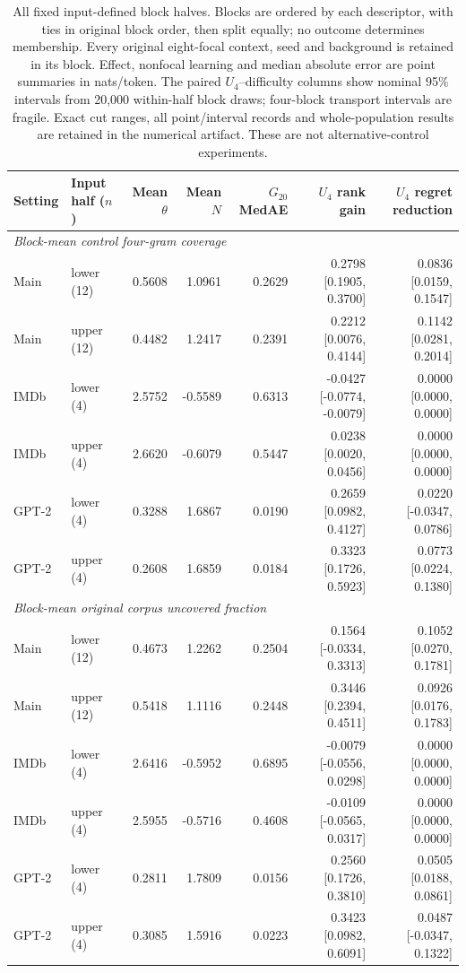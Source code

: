 \begin{table}[tp]
\centering
\footnotesize
\setlength{\tabcolsep}{3pt}
\begin{tabular}{llrrrrr}
\toprule
Setting & Input half ($n$) & Mean $\theta$ & Mean $N$ & $G_{20}$ MedAE & $U_4$ rank gain & $U_4$ regret reduction \\
\midrule
\multicolumn{7}{l}{\emph{Block-mean control four-gram coverage}}\\
Main & lower (12) & 0.5608 & 1.0961 & 0.2629 & 0.2798 [0.1905, 0.3700] & 0.0836 [0.0159, 0.1547] \\
Main & upper (12) & 0.4482 & 1.2417 & 0.2391 & 0.2212 [0.0076, 0.4144] & 0.1142 [0.0281, 0.2014] \\
IMDb & lower (4) & 2.5752 & -0.5589 & 0.6313 & -0.0427 [-0.0774, -0.0079] & 0.0000 [0.0000, 0.0000] \\
IMDb & upper (4) & 2.6620 & -0.6079 & 0.5447 & 0.0238 [0.0020, 0.0456] & 0.0000 [0.0000, 0.0000] \\
GPT-2 & lower (4) & 0.3288 & 1.6867 & 0.0190 & 0.2659 [0.0982, 0.4127] & 0.0220 [-0.0347, 0.0786] \\
GPT-2 & upper (4) & 0.2608 & 1.6859 & 0.0184 & 0.3323 [0.1726, 0.5923] & 0.0773 [0.0224, 0.1380] \\
\multicolumn{7}{l}{\emph{Block-mean original corpus uncovered fraction}}\\
Main & lower (12) & 0.4673 & 1.2262 & 0.2504 & 0.1564 [-0.0334, 0.3313] & 0.1052 [0.0270, 0.1781] \\
Main & upper (12) & 0.5418 & 1.1116 & 0.2448 & 0.3446 [0.2394, 0.4511] & 0.0926 [0.0176, 0.1783] \\
IMDb & lower (4) & 2.6416 & -0.5952 & 0.6895 & -0.0079 [-0.0556, 0.0298] & 0.0000 [0.0000, 0.0000] \\
IMDb & upper (4) & 2.5955 & -0.5716 & 0.4608 & -0.0109 [-0.0565, 0.0317] & 0.0000 [0.0000, 0.0000] \\
GPT-2 & lower (4) & 0.2811 & 1.7809 & 0.0156 & 0.2560 [0.1726, 0.3810] & 0.0505 [0.0188, 0.0861] \\
GPT-2 & upper (4) & 0.3085 & 1.5916 & 0.0223 & 0.3423 [0.0982, 0.6091] & 0.0487 [-0.0347, 0.1322] \\
\bottomrule
\end{tabular}
\caption{All fixed input-defined block halves. Blocks are ordered by each descriptor, with ties in original block order, then split equally; no outcome determines membership. Every original eight-focal context, seed and background is retained in its block. Effect, nonfocal learning and median absolute error are point summaries in nats/token. The paired $U_4$--difficulty columns show nominal 95\% intervals from 20,000 within-half block draws; four-block transport intervals are fragile. Exact cut ranges, all point/interval records and whole-population results are retained in the numerical artifact. These are not alternative-control experiments.}
\label{tab:review_strata}
\end{table}

